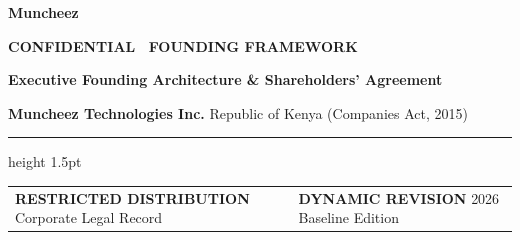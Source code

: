 \documentclass[11pt,a4paper]{article}
\begin{document}
\pagestyle{empty}
\begin{titlepage}
    \vspace*{2.5cm}
    
    {\fontsize{44}{52}\sffamily\bfseries\color{CorporateNavy} Muncheez}
    
    \vspace{0.8cm}
    
    
    \vspace{2.5cm}
    
    {\fontsize{11}{14}\sffamily\bfseries\color{LinkBlue}\uppercase{Confidential \textperiodcentered\ Founding Framework}}
    
    \vspace{0.5cm}
    
    {\fontsize{28}{34}\sffamily\bfseries\color{CorporateNavy} Executive Founding Architecture \& Shareholders' Agreement}
    
    \vspace{1.0cm}
    
    {\fontsize{11}{16}\sffamily\bfseries\color{CorporateNavy} Muncheez Technologies Inc.} \newline
    {\fontsize{10}{14}\sffamily\color{SolidBlack} Republic of Kenya (Companies Act, 2015)}
    
    \vfill
    
    \color{RuleNavy}\hrule height 1.5pt
    \vspace{0.5cm}
    
    \begin{tabularx}{\textwidth}{@{} X >{\raggedleft\arraybackslash}X @{}}
        \textsf{\small\bfseries\color{CorporateNavy} RESTRICTED DISTRIBUTION} \newline
        \textsf{\scriptsize\color{SolidBlack} Corporate Legal Record} &
        \textsf{\small\bfseries\color{CorporateNavy} DYNAMIC REVISION} \newline
        \textsf{\scriptsize\color{SolidBlack} 2026 Baseline Edition} \\
    \end{tabularx}
\end{titlepage}
\end{document}
